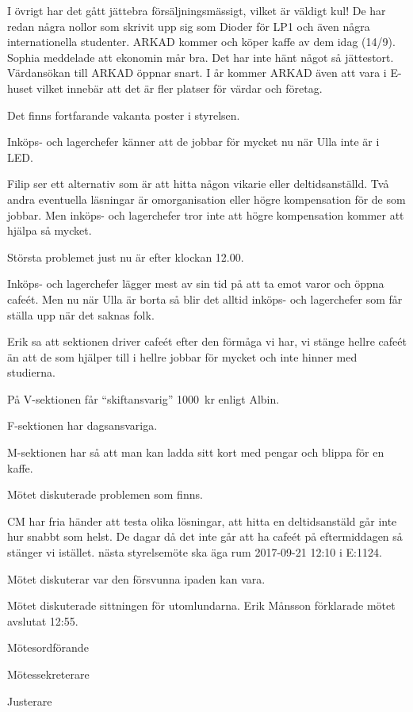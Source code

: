 \documentclass[10pt]{article}
\def\mo{Erik Månsson}
\def\ms{Johan Karlberg}
\def\ji{Josefine Sandström}
\begin{document}
\begin{paragrafer}
\begin{paragrafer}
I övrigt har det gått jättebra försäljningsmässigt, vilket är väldigt kul! De har redan några nollor som skrivit upp sig som Dioder för LP1 och även några internationella studenter. ARKAD kommer och köper kaffe av dem idag (14/9).
Sophia meddelade att ekonomin mår bra. Det har inte hänt något så jättestort.
Värdansökan till ARKAD öppnar snart. I år kommer ARKAD även att vara i E-huset vilket innebär att det är fler platser för värdar och företag.

Det finns fortfarande vakanta poster i styrelsen.
\end{paragrafer}

Inköps- och lagerchefer känner att de jobbar för mycket nu när Ulla inte är i LED.

Filip ser ett alternativ som är att hitta någon vikarie eller deltidsanställd.
Två andra eventuella läsningar är omorganisation eller högre kompensation för de som jobbar. Men inköps- och lagerchefer tror inte att högre kompensation kommer att hjälpa så mycket.

Största problemet just nu är efter klockan 12.00.

Inköps- och lagerchefer lägger mest av sin tid på att ta emot varor och öppna cafeét. Men nu när Ulla är borta så blir det alltid inköps- och lagerchefer som får ställa upp när det saknas folk.

Erik sa att sektionen driver cafeét efter den förmåga vi har, vi stänge hellre cafeét än att de som hjälper till i hellre jobbar för mycket och inte hinner med studierna.

På V-sektionen får ``skiftansvarig'' \SI{1000}{kr} enligt Albin.

F-sektionen har dagsansvariga.

M-sektionen har så att man kan ladda sitt kort med pengar och blippa för en kaffe.

Mötet diskuterade problemen som finns.

CM har fria händer att testa olika lösningar, att hitta en deltidsanstäld går inte hur snabbt som helst. De dagar då det inte går att ha cafeét på eftermiddagen så stänger vi istället.
{\Mba}nästa styrelsemöte ska äga rum 2017-09-21 12:10 i E:1124.

{\Ibfu}

Mötet diskuterar var den försvunna ipaden kan vara.

Mötet diskuterade sittningen för utomlundarna.
{\mo} förklarade mötet avslutat 12:55.

\end{paragrafer}

\hidesignfoot
\begin{signatures}{3}
\signature{\mo}{Mötesordförande}
\signature{\ms}{Mötessekreterare}
\signature{\ji}{Justerare}
\end{signatures}
\end{document}
